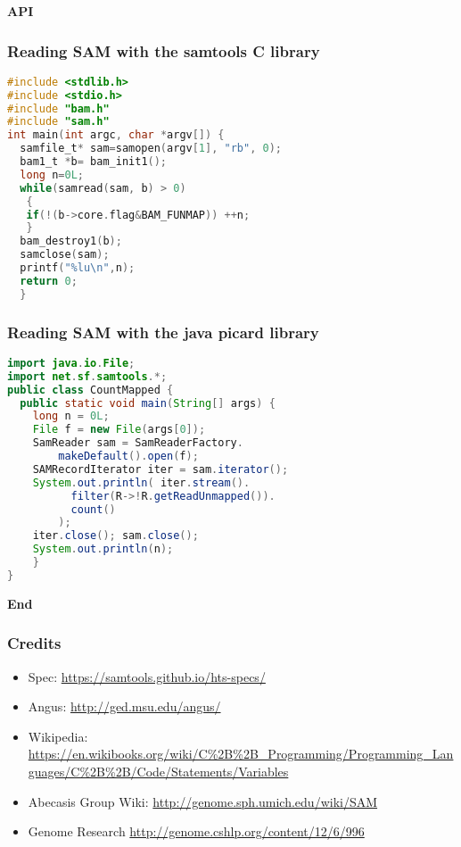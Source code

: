 \documentclass{beamer}
\newcommand{\centeredtitle}[1]{
\begin{center}
    \Huge{\bf{#1}}
\end{center}
}
\newcommand{\hugeslide}[1]{
\begin{frame}
\centeredtitle{#1}
\end{frame}
}
\begin{document}
\hugeslide{API}

\begin{frame}[fragile]
\frametitle{Reading SAM with the samtools C library}

\begin{lstlisting}[language=C]
#include <stdlib.h>
#include <stdio.h>
#include "bam.h"
#include "sam.h"
int main(int argc, char *argv[]) {
  samfile_t* sam=samopen(argv[1], "rb", 0);
  bam1_t *b= bam_init1();
  long n=0L;
  while(samread(sam, b) > 0)
   {
   if(!(b->core.flag&BAM_FUNMAP)) ++n;
   }
  bam_destroy1(b);
  samclose(sam);
  printf("%lu\n",n);
  return 0;
  }
\end{lstlisting}
\end{frame}



\begin{frame}[fragile]
\frametitle{Reading SAM with the java picard library}

\begin{lstlisting}[language=java]
import java.io.File;
import net.sf.samtools.*;
public class CountMapped {
  public static void main(String[] args) {
    long n = 0L;
    File f = new File(args[0]);
    SamReader sam = SamReaderFactory.
		makeDefault().open(f);
    SAMRecordIterator iter = sam.iterator();
    System.out.println( iter.stream().
    	  filter(R->!R.getReadUnmapped()).
    	  count()
    	);
    iter.close(); sam.close();
    System.out.println(n);
    }
}
\end{lstlisting}
\end{frame}


\hugeslide{End}


\begin{frame}[fragile]
\frametitle{Credits}
\begin{itemize}
\item Spec: \url{https://samtools.github.io/hts-specs/}
\item Angus: \url{http://ged.msu.edu/angus/}
\item Wikipedia: \url{https://en.wikibooks.org/wiki/C%2B%2B_Programming/Programming_Languages/C%2B%2B/Code/Statements/Variables}
\item Abecasis Group Wiki: \url{http://genome.sph.umich.edu/wiki/SAM}
\item Genome Research \url{http://genome.cshlp.org/content/12/6/996}
\end{itemize}
\end{frame}
\end{document}
